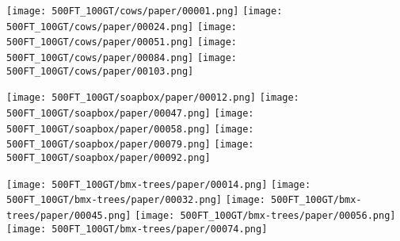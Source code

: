\documentclass[10pt,twocolumn,letterpaper]{article}
\begin{document}
	
	\texttt{[image: 500FT\_100GT/cows/paper/00001.png]}
	\hspace*{\fill} %
	\texttt{[image: 500FT\_100GT/cows/paper/00024.png]}
	\hspace*{\fill} %
	\texttt{[image: 500FT\_100GT/cows/paper/00051.png]}
	\hspace*{\fill} %
	\texttt{[image: 500FT\_100GT/cows/paper/00084.png]}
	\hspace*{\fill} %
	\texttt{[image: 500FT\_100GT/cows/paper/00103.png]}
	
	\texttt{[image: 500FT\_100GT/soapbox/paper/00012.png]}
	\hspace*{\fill} %
	\texttt{[image: 500FT\_100GT/soapbox/paper/00047.png]}
	\hspace*{\fill} %
	\texttt{[image: 500FT\_100GT/soapbox/paper/00058.png]}
	\hspace*{\fill} %
	\texttt{[image: 500FT\_100GT/soapbox/paper/00079.png]}
	\hspace*{\fill} %
	\texttt{[image: 500FT\_100GT/soapbox/paper/00092.png]}
	
	\texttt{[image: 500FT\_100GT/bmx-trees/paper/00014.png]}
	\hspace*{\fill} %
	\texttt{[image: 500FT\_100GT/bmx-trees/paper/00032.png]}
	\hspace*{\fill} %
	\texttt{[image: 500FT\_100GT/bmx-trees/paper/00045.png]}
	\hspace*{\fill} %
	\texttt{[image: 500FT\_100GT/bmx-trees/paper/00056.png]}
	\hspace*{\fill} %
	\texttt{[image: 500FT\_100GT/bmx-trees/paper/00074.png]}
	
\end{document}

